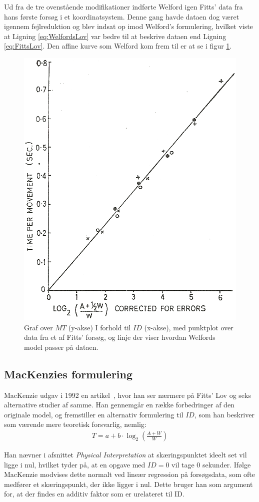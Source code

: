 Ud fra de tre ovenstående modifikationer indførte Welford igen Fitts' data fra hans første forsøg i et koordinatsystem. Denne gang havde dataen dog været igennem fejlreduktion og blev indsat op imod Welford's formulering, hvilket viste at Ligning \ref{eq:WelfordsLov} var bedre til at beskrive dataen end Ligning \ref{eq:FittsLov}. Den affine kurve som Welford kom frem til er at se i figur \ref{fig:WelfordGraf2}.
\begin{figure}[h]
\centering
\includegraphics[width=.5\linewidth]{images/illustrations/welford_plot_2}
\caption{Graf over $MT$ (y-akse) I forhold til $ID$ (x-akse), med punktplot over data fra et af Fitts' forsøg, og linje der viser hvordan Welfords model passer på dataen.}
\label{fig:WelfordGraf2}
\end{figure}

\subsection*{MacKenzies formulering}
MacKenzie udgav i 1992 en artikel~\cite{mackenzie1992}, hvor han ser nærmere på Fitts' Lov og seks alternative studier af samme. Han gennemgår en række forbedringer af den originale model, og fremstiller en alternativ formulering til $ID$, som han beskriver som værende mere teoretisk forsvarlig, nemlig:
\begin{align}
T=a+b\cdot\log_2\left({\frac{A+W}{W}}\right)
\end{align}

Han nævner i afsnittet \emph{Physical Interpretation} at skæringspunktet ideelt set vil ligge i nul, hvilket tyder på, at en opgave med $ID=0$ vil tage 0 sekunder. Ifølge MacKenzie modvises dette normalt ved lineær regression på forsøgsdata, som ofte medfører et skæringspunkt, der ikke ligger i nul. Dette bruger han som argument for, at der findes en additiv faktor som er urelateret til ID.\\

